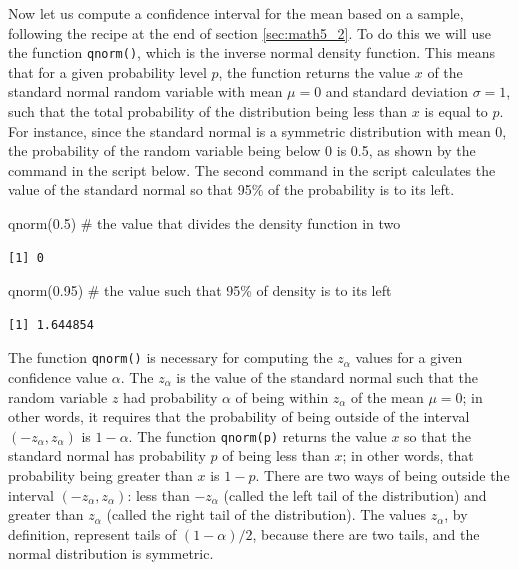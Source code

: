 \documentclass[
  letterpaper,
  DIV=11,
  numbers=noendperiod]{scrreprt}
\newenvironment{Shaded}{\begin{snugshade}}{\end{snugshade}}
\newcommand{\CommentTok}[1]{\textcolor[rgb]{0.37,0.37,0.37}{#1}}
\newcommand{\FloatTok}[1]{\textcolor[rgb]{0.68,0.00,0.00}{#1}}
\newcommand{\FunctionTok}[1]{\textcolor[rgb]{0.28,0.35,0.67}{#1}}
\newcommand{\NormalTok}[1]{\textcolor[rgb]{0.00,0.23,0.31}{#1}}
\begin{document}
Now let us compute a confidence interval for the mean based on a sample,
following the recipe at the end of section \ref{sec:math5_2}. To do this
we will use the function \texttt{qnorm()}, which is the inverse normal
density function. This means that for a given probability level \(p\),
the function returns the value \(x\) of the standard normal random
variable with mean \(\mu=0\) and standard deviation \(\sigma=1\), such
that the total probability of the distribution being less than \(x\) is
equal to \(p\). For instance, since the standard normal is a symmetric
distribution with mean 0, the probability of the random variable being
below 0 is 0.5, as shown by the command in the script below. The second
command in the script calculates the value of the standard normal so
that 95\% of the probability is to its left.

\begin{Shaded}
\begin{Highlighting}[]
\FunctionTok{qnorm}\NormalTok{(}\FloatTok{0.5}\NormalTok{) }\CommentTok{\# the value that divides the density function in two}
\end{Highlighting}
\end{Shaded}

\begin{verbatim}
[1] 0
\end{verbatim}

\begin{Shaded}
\begin{Highlighting}[]
\FunctionTok{qnorm}\NormalTok{(}\FloatTok{0.95}\NormalTok{) }\CommentTok{\# the value such that 95\% of density is to its left }
\end{Highlighting}
\end{Shaded}

\begin{verbatim}
[1] 1.644854
\end{verbatim}

The function \texttt{qnorm()} is necessary for computing the
\(z_\alpha\) values for a given confidence value \(\alpha\). The
\(z_\alpha\) is the value of the standard normal such that the random
variable \(z\) had probability \(\alpha\) of being within \(z_\alpha\)
of the mean \(\mu=0\); in other words, it requires that the probability
of being outside of the interval \((-z_\alpha, z_\alpha)\) is
\(1-\alpha\). The function \texttt{qnorm(p)} returns the value \(x\) so
that the standard normal has probability \(p\) of being less than \(x\);
in other words, that probability being greater than \(x\) is \(1-p\).
There are two ways of being outside the interval
\((-z_\alpha, z_\alpha)\): less than \(-z_\alpha\) (called the left tail
of the distribution) and greater than \(z_\alpha\) (called the right
tail of the distribution). The values \(z_\alpha\), by definition,
represent tails of \((1-\alpha)/2\), because there are two tails, and
the normal distribution is symmetric.
\end{document}
